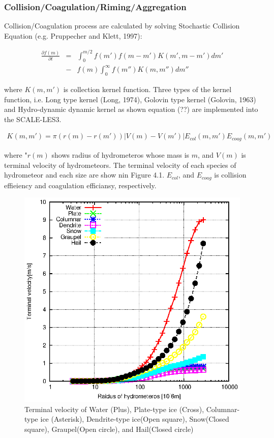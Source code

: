 \subsubsection{Collision/Coagulation/Riming/Aggregation}
Collision/Coagulation process are calculated by solving Stochastic Collision Equation (e.g. Pruppecher and Klett, 1997):

\begin{eqnarray}
\frac{\partial f(m)}{\partial t}&=&\int_0^{m/2}f(m')f(m-m')K(m',m-m')dm' \nonumber\\
&-&f(m)\int_0^{\infty}f(m'')K(m,m'')dm''
\end{eqnarray}

where $K(m,m')$ is collection kernel function. Three types of the kernel function, i.e. Long type kernel (Long, 1974), Golovin type kernel (Golovin, 1963) and Hydro-dynamic dynamic kernel as shown equation (??) are implemented into the SCALE-LES3.

\begin{eqnarray}
K(m,m')=\pi(r(m)-r(m'))\left| V(m)-V(m')\right |E_{col}(m,m')E_{coag}(m,m')
\end{eqnarray}

where "$r(m)$ shows radius of hydrometeros whose mass is $m$, and $V(m)$ is terminal velocity of hydrometeors. The terminal velocity of each species of hydrometeor and each size are show nin Figure 4.1. $E_{col}$, and $E_{coag}$ is collision effieiency and coagulation efficiansy, respectively.\\ 

\begin{figure}[h]
\begin{center}
\includegraphics[scale=0.9]{./figure/terminal-velocity.eps}
\end{center}
\caption{Terminal velocity of Water (Plus), Plate-type ice (Cross), Columnar-type ice (Asterisk), Dendrite-type ice(Open square), Snow(Closed square), Graupel(Open circle), and Hail(Closed circle)} 
\end{figure}


